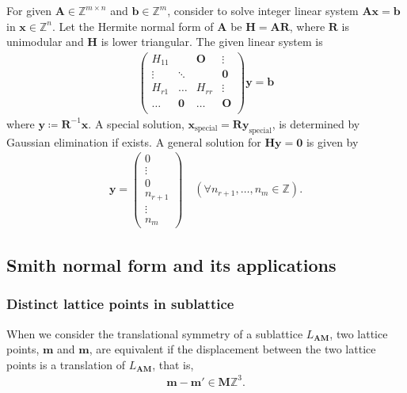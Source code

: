 For given $\bm{A} \in \mathbb{Z}^{m \times n}$ and $\bm{b} \in \mathbb{Z}^{m}$, consider to solve integer linear system $\bm{Ax} = \bm{b}$ in $\bm{x} \in \mathbb{Z}^{n}$.
Let the Hermite normal form of $\bm{A}$ be $\bm{H} = \bm{AR}$, where $\bm{R}$ is unimodular and $\bm{H}$ is lower triangular.
The given linear system is
\begin{align}
  \begin{pmatrix}
    H_{11} &        & \bm{O} & \vdots     \\
    \vdots & \ddots &        & \bm{0} \\
    H_{r1} & \ldots & H_{rr} & \vdots     \\
    \ldots & \bm{0} & \ldots & \bm{O} \\
  \end{pmatrix}
  \bm{y} = \bm{b}
\end{align}
where $\mathbf{y} \coloneqq \bm{R}^{-1}\bm{x}$.
A special solution, $\bm{x}_{\mathrm{special}} = \bm{R}\bm{y}_{\mathrm{special}}$, is determined by Gaussian elimination if exists.
A general solution for $\bm{Hy}=\bm{0}$ is given by
\begin{align}
  \bm{y} = \begin{pmatrix} 0 \\ \vdots \\ 0 \\ n_{r+1} \\ \vdots \\ n_{m} \end{pmatrix}
        \quad (\forall n_{r+1},\dots, n_{m} \in \mathbb{Z}).
\end{align}

\subsection{Smith normal form and its applications}

\subsubsection{Distinct lattice points in sublattice}

When we consider the translational symmetry of a sublattice $L_{\bm{AM}}$, two lattice points, $\bm{m}$ and $\bm{m}$, are equivalent if the displacement between the two lattice points is a translation of $L_{\bm{AM}}$, that is,
\begin{align}
  \label{eq:equiv-lattice-points}
  \bm{m} - \bm{m}' \in \bm{M}\mathbb{Z}^{3}.
\end{align}

